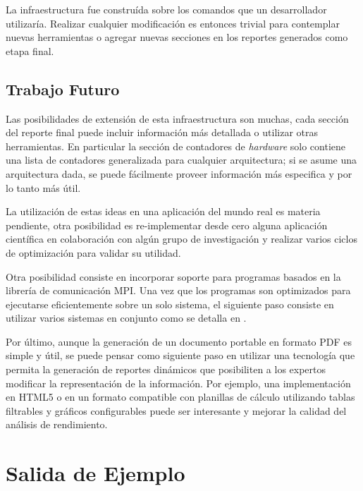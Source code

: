 \documentclass[a4paper]{report}
\begin{document}
\bigskip

La infraestructura fue construída sobre los comandos que un desarrollador utilizaría. Realizar cualquier modificación es entonces trivial para contemplar nuevas herramientas
o agregar nuevas secciones en los reportes generados como etapa final.

\section{Trabajo Futuro}

Las posibilidades de extensión de esta infraestructura son muchas, cada sección del reporte final puede incluir información más detallada o utilizar otras herramientas. En particular la sección de contadores de {\it hardware} solo contiene una lista de contadores generalizada para cualquier arquitectura; si se asume una arquitectura dada, se puede fácilmente proveer información más especifica y por lo tanto más útil.

\bigskip

La utilización de estas ideas en una aplicación del mundo real es materia pendiente, otra posibilidad es re-implementar desde cero alguna aplicación
científica en colaboración con algún grupo de investigación y realizar varios ciclos de optimización para validar su utilidad.

\bigskip

Otra posibilidad consiste en incorporar soporte para programas basados en la librería de comunicación MPI. Una vez que los programas son optimizados para ejecutarse eficientemente sobre un solo sistema, el siguiente paso consiste en utilizar varios sistemas en conjunto como se detalla en \cite{beowulf-parallel-workstation} \cite{tinetti}.

\bigskip

Por último, aunque la generación de un documento portable en formato PDF es simple y útil, se puede pensar como siguiente paso en utilizar una tecnología que permita la generación de reportes dinámicos que posibiliten a los expertos modificar la representación de la información. Por ejemplo, una implementación en HTML5 o en un formato compatible con planillas de cálculo utilizando tablas filtrables y gráficos configurables puede ser interesante y mejorar la calidad del análisis de rendimiento.



\appendix

\chapter{Salida de Ejemplo} \label{chapter:output}
\end{document}
